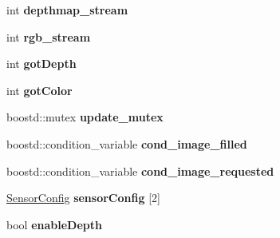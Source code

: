 \begin{DoxyCompactItemize}
\item 
int {\bfseries depthmap\+\_\+stream}\hypertarget{classpangolin_1_1_depth_sense_video_a6dda8481d4185db9e5ed7e7044409b5d}{}\label{classpangolin_1_1_depth_sense_video_a6dda8481d4185db9e5ed7e7044409b5d}

\item 
int {\bfseries rgb\+\_\+stream}\hypertarget{classpangolin_1_1_depth_sense_video_a1f58c99716587aa8ecc4f442778fdc4c}{}\label{classpangolin_1_1_depth_sense_video_a1f58c99716587aa8ecc4f442778fdc4c}

\item 
int {\bfseries got\+Depth}\hypertarget{classpangolin_1_1_depth_sense_video_a5bd47c119eff7792768487b54c4bff01}{}\label{classpangolin_1_1_depth_sense_video_a5bd47c119eff7792768487b54c4bff01}

\item 
int {\bfseries got\+Color}\hypertarget{classpangolin_1_1_depth_sense_video_a1d6bca7d57bdaab9955dec36b6d120d9}{}\label{classpangolin_1_1_depth_sense_video_a1d6bca7d57bdaab9955dec36b6d120d9}

\item 
boostd\+::mutex {\bfseries update\+\_\+mutex}\hypertarget{classpangolin_1_1_depth_sense_video_a928f9cc22afb1cb78b58e716e8c8d7c6}{}\label{classpangolin_1_1_depth_sense_video_a928f9cc22afb1cb78b58e716e8c8d7c6}

\item 
boostd\+::condition\+\_\+variable {\bfseries cond\+\_\+image\+\_\+filled}\hypertarget{classpangolin_1_1_depth_sense_video_af0c2dfb8f8a6dd9035e66b4a36b2cf54}{}\label{classpangolin_1_1_depth_sense_video_af0c2dfb8f8a6dd9035e66b4a36b2cf54}

\item 
boostd\+::condition\+\_\+variable {\bfseries cond\+\_\+image\+\_\+requested}\hypertarget{classpangolin_1_1_depth_sense_video_a6d004f68191ff42f6619bca73b37c05f}{}\label{classpangolin_1_1_depth_sense_video_a6d004f68191ff42f6619bca73b37c05f}

\item 
\hyperlink{structpangolin_1_1_depth_sense_video_1_1_sensor_config}{Sensor\+Config} {\bfseries sensor\+Config} \mbox{[}2\mbox{]}\hypertarget{classpangolin_1_1_depth_sense_video_a9c01629371bfec1ed8282fabac2f0fee}{}\label{classpangolin_1_1_depth_sense_video_a9c01629371bfec1ed8282fabac2f0fee}

\item 
bool {\bfseries enable\+Depth}\hypertarget{classpangolin_1_1_depth_sense_video_a8bd09cc5c54d7305fbc136e4e299101e}{}\label{classpangolin_1_1_depth_sense_video_a8bd09cc5c54d7305fbc136e4e299101e}


\end{DoxyCompactItemize}
